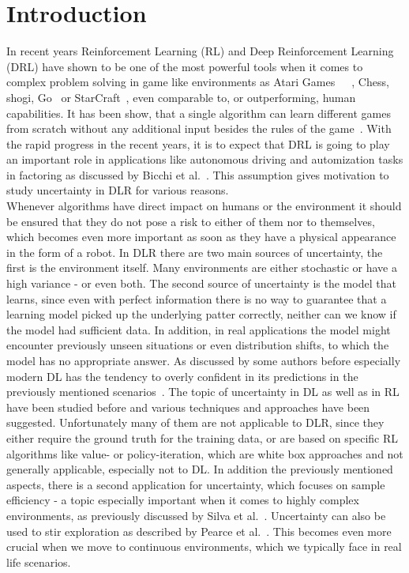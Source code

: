 \documentclass[11pt,a4paper]{article}
\begin{document}
    \section{Introduction}\label{sec:introduction}
    In recent years Reinforcement Learning (RL) and Deep Reinforcement Learning (DRL) have shown to be one of the most powerful tools when it comes to complex problem solving in game like environments as Atari Games~\cite{mnih_asynchronous_2016}~\cite{mnih_human-level_2015}~\cite{van_hasselt_deep_2015}, Chess, shogi, Go~\cite{silver_general_2018} or StarCraft~\cite{vinyals_grandmaster_2019}, even comparable to, or outperforming, human capabilities.
	It has been show, that a single algorithm can learn different games from scratch without any additional input besides the rules of the game~\cite{silver_general_2018}.
	With the rapid progress in the recent years, it is to expect that DRL is going to play an important role in applications like autonomous driving and automization tasks in factoring as discussed by Bicchi et al.~\cite{bicchi_safety_nodate}.
	This assumption gives motivation to study uncertainty in DLR for various reasons.\\
	Whenever algorithms have direct impact on humans or the environment it should be ensured that they do not pose a risk to either of them nor to themselves, which becomes even more important as soon as they have a physical appearance in the form of a robot.
	In DLR there are two main sources of uncertainty, the first is the environment itself.
	Many environments are either stochastic or have a high variance - or even both.
	The second source of uncertainty is the model that learns, since even with perfect information there is no way to guarantee that a learning model picked up the underlying patter correctly, neither can we know if the model had sufficient data.
	In addition, in real applications the model might encounter previously unseen situations or even distribution shifts, to which the model has no appropriate answer.
	As discussed by some authors before especially modern DL has the tendency to overly confident in its predictions in the previously mentioned scenarios~\cite{gal_dropout_2016}.
	The topic of uncertainty in DL as well as in RL have been studied before and various techniques and approaches have been suggested.
	Unfortunately many of them are not applicable to DLR, since they either require the ground truth for the training data, or are based on specific RL algorithms like value- or policy-iteration, which are white box approaches and not generally applicable, especially not to DL.
	In addition the previously mentioned aspects, there is a second application for uncertainty, which focuses on sample efficiency - a topic especially important when it comes to highly complex environments, as previously discussed by Silva et al.~\cite{da_silva_uncertainty-aware_2020}.
	Uncertainty can also be used to stir exploration as described by Pearce et al.~\cite{pearce_uncertainty_2018}.
	This becomes even more crucial when we move to continuous environments, which we typically face in real life scenarios.\\
\end{document}
